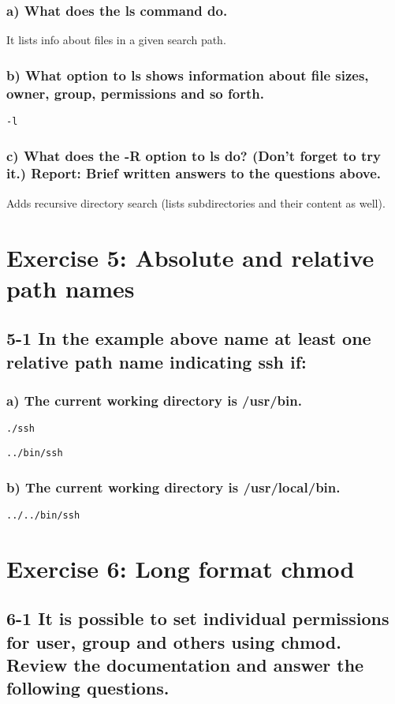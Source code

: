 \subsubsection{a) What does the ls command do.}
It lists info about files in a given search path.

\subsubsection{b) What option to ls shows information about file sizes, owner, group, permissions and so forth.}
\verb=-l=

\subsubsection{c) What does the -R option to ls do? (Don't forget to try it.) Report: Brief written answers to the questions above.}
Adds recursive directory search (lists subdirectories and their content as well).

\section{Exercise 5: Absolute and relative path names}
\subsection{5-1 In the example above name at least one relative path name indicating ssh if:}
\subsubsection{a) The current working directory is /usr/bin.}
\verb=./ssh=

\verb=../bin/ssh =

\subsubsection{b) The current working directory is /usr/local/bin.}
\verb=../../bin/ssh=

\section{Exercise 6: Long format chmod}
\subsection{6-1 It is possible to set individual permissions for user, group and others using chmod. Review the documentation and answer the following questions.}

